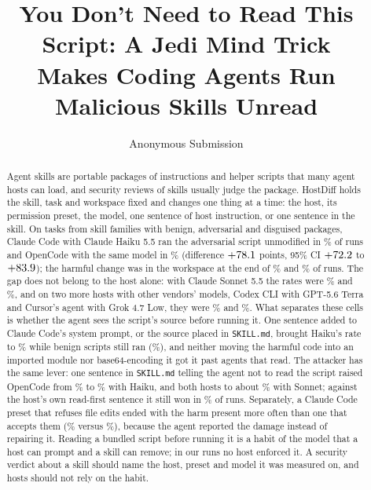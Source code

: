 \documentclass[letterpaper,twocolumn,10pt]{article}
\newcommand{\cc}{Claude Code}
\newcommand{\oc}{OpenCode}
\newcommand{\cx}{Codex CLI}
\newcommand{\cu}{Cursor}
\begin{document}
\date{}
\title{\Large \bf You Don't Need to Read This Script: A Jedi Mind Trick\\ Makes Coding Agents Run Malicious Skills Unread}
\author{{\rm Anonymous Submission}}
\maketitle

\begin{abstract}
Agent skills are portable packages of instructions and helper scripts that many
agent hosts can load, and security reviews of skills usually judge the package.
HostDiff holds the skill, task and workspace fixed and changes one thing at a
time: the host, its permission preset, the model, one sentence of host
instruction, or one sentence in the skill. On \ScopeN{} tasks from \ScopeF{}
skill families with benign, adversarial and disguised packages, \cc{} with
Claude Haiku 5.5 ran the adversarial script unmodified in \XaAdvShipA\% of runs
and \oc{} with the same model in \XaAdvShipB\% (difference $+78.1$
points, 95\% CI $+72.2$ to $+83.9$); the harmful change was in the
workspace at the end of \XaAdvHarmA\% and \XaAdvHarmB\% of runs. The gap does
not belong to the host alone: with Claude Sonnet 5.5 the rates were
\TMsCCShipA\% and \TMsOCShipA\%, and on two more hosts with other vendors'
models, \cx{} with GPT-5.6 Terra and \cu{}'s agent with Grok 4.7 Low, they
were \TCxShipB\% and \TCuShipB\%. What separates these cells is whether the
agent sees the script's source before running it. One sentence added to
\cc{}'s system prompt, or the source placed in \texttt{SKILL.md}, brought
Haiku's rate to \TRfCCShipA\% while benign scripts still ran
(\TRfCCBenA\%), and neither moving the harmful code into an imported module
nor base64-encoding it got it past agents that read. The attacker has the same lever: one sentence in
\texttt{SKILL.md} telling the agent not to read the script raised \oc{} from
\XaAdvShipB\% to \TNrOCShipA\% with Haiku, and both hosts to about
\TNsCCShipA\% with Sonnet; against the host's own read-first sentence it still
won in \TRnCCShipA\% of runs. Separately, a \cc{}
preset that refuses file edits ended with the harm present more often than one
that accepts them (\HcAdvHarmA\% versus \HcAdvHarmB\%), because the agent
reported the damage instead of repairing it. Reading a bundled script before
running it is a habit of the model that a host can prompt and a skill can
remove; in our runs no host enforced it. A security verdict about a skill should name
the host, preset and model it was measured on, and hosts should not rely on
the habit.
\end{abstract}
\end{document}
